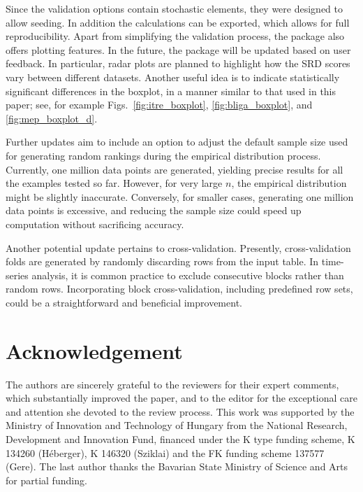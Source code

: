 Since the validation options contain stochastic elements, they were designed to allow seeding. In addition the calculations can be exported, which allows for full reproducibility. Apart from simplifying the validation process, the package also offers plotting features. In the future, the package will be updated based on user feedback. In particular, radar plots are planned to highlight how the SRD scores vary between different datasets. Another useful idea is to indicate statistically significant differences in the boxplot, in a manner similar to that used in this paper; see, for example Figs.~\ref{fig:itre_boxplot}, \ref{fig:bliga_boxplot}, and \ref{fig:mep_boxplot_d}.

Further updates aim to include an option to adjust the default sample size used for generating random rankings during the empirical distribution process. Currently, one million data points are generated, yielding precise results for all the examples tested so far. However, for very large $n$, the empirical distribution might be slightly inaccurate. Conversely, for smaller cases, generating one million data points is excessive, and reducing the sample size could speed up computation without sacrificing accuracy.

Another potential update pertains to cross-validation. Presently, cross-validation folds are generated by randomly discarding rows from the input table. In time-series analysis, it is common practice to exclude consecutive blocks rather than random rows. Incorporating block cross-validation, including predefined row sets, could be a straightforward and beneficial improvement.


\section*{Acknowledgement}
The authors are sincerely grateful to the reviewers for their expert comments, which substantially improved the paper, and to the editor for the exceptional care and attention she devoted to the review process.
This work was supported by the Ministry of Innovation and Technology of Hungary from the National Research, Development and Innovation Fund, financed under the K type funding scheme, K 134260 (Héberger), K 146320 (Sziklai) and the FK funding scheme 137577 (Gere). The last author thanks the Bavarian State Ministry of Science and Arts for partial funding.
%


